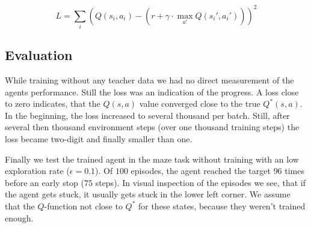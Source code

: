 \documentclass[a4paper,14pt]{article}
\begin{document}
\begin{equation*}
  \label{eq:loss}
  L = \sum_i(Q(s_i, a_i) - (r + \gamma \cdot \max_{a'}Q(s_i', a_i')))^2
\end{equation*}

\subsection{Evaluation}

While training without any teacher data we had no direct measurement of the agents
performance. Still the loss was an indication of the progress.
A loss close to zero indicates, that the $Q(s, a)$ value converged close to the
true $Q^*(s, a)$.
In the beginning, the loss increased to several thousand per batch. Still, after
several then thousand environment steps (over one thousand training steps)
the loss became two-digit and finally smaller than one.

Finally we test the trained agent in the maze task without training with an low
exploration rate ($\epsilon = 0.1$).
Of $100$ episodes, the agent reached the target $96$ times before an early stop
($75$ steps).
In visual inspection of the episodes we see, that if the agent gets stuck, it usually gets
stuck in the lower left corner. We assume that the $Q$-function not close to
$Q^*$ for these states, because they weren't trained enough.

\end{document}
